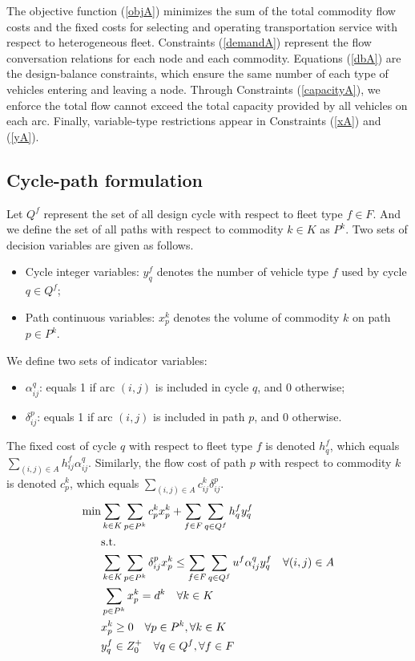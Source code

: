 \documentclass[11pt,nonblindrev,fleqn]{article}
\begin{document}
The objective function (\ref{objA}) minimizes the sum of the total commodity flow costs and the fixed costs for selecting and operating transportation service with respect to heterogeneous fleet. Constraints (\ref{demandA}) represent the flow conversation relations for each node and each commodity. Equations (\ref{dbA}) are the design-balance constraints, which ensure the same number of each type of vehicles entering and leaving a node. Through Constraints (\ref{capacityA}), we enforce the total flow cannot exceed the total capacity provided by all vehicles on each arc. Finally, variable-type restrictions appear in Constraints (\ref{xA}) and (\ref{yA}).

\subsection{Cycle-path formulation}
Let $Q^f$ represent the set of all design cycle with respect to fleet type $f\in F$. And we define the set of all paths with respect to commodity $k\in K$ as $P^k$. Two sets of decision variables are given as follows.
\begin{itemize}
  \item Cycle integer variables: $y_q^f$ denotes the number of vehicle type $f$ used by cycle $q\in Q^f$;
  \item Path continuous variables: $x_p^k$ denotes the volume of commodity $k$ on path $p\in P^k$.
\end{itemize}
We define two sets of indicator variables:
\begin{itemize}
  \item $\alpha_{ij}^q$: equals 1 if arc $(i,j)$ is included in cycle $q$, and 0 otherwise;
  \item $\delta_{ij}^p$: equals 1 if arc $(i,j)$ is included in path $p$, and 0 otherwise.
\end{itemize}

The fixed cost of cycle $q$ with respect to fleet type $f$ is denoted $h_q^f$, which equals $\sum_{(i,j)\in A} h_{ij}^f \alpha_{ij}^q$. Similarly, the flow cost of path $p$ with respect to commodity $k$ is denoted $c_p^k$, which equals $\sum_{(i,j)\in A} c_{ij}^k \delta_{ij}^p$.
\begin{align}
  \min &    \sum_{k\in K}\sum_{p\in P^k}c_p^k x_p^k +  \sum_{f\in F}\sum_{q\in Q^f}h_q^f y_q^f  \label{objCP}    \\
         & \rm{s.t.} \nonumber \\
         &     \sum_{k\in K}\sum_{p\in P^k}\delta_{ij}^p x_p^k \leq  \sum_{f\in F}\sum_{q\in Q^f}u^f \alpha_{ij}^q y_q^f      \quad \forall (i,j)\in A \label{capacityCP}\\
         &     \sum_{p\in P^k}x_p^k = d^k      \quad       \forall k\in K  \label{demandCP}    \\
         &      x_p^k \geq 0        \quad       \forall p\in P^k,\forall k\in K     \label{xCP} \\
         &      y_q^f \in Z_0^+     \quad       \forall q\in Q^f, \forall f\in F    \label{yCP}
\end{align}
\end{document}

